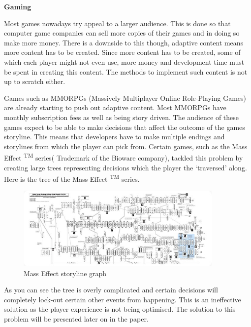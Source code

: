 \documentclass[11pt]{article}
\begin{document}
\vspace{4.0 mm}
\textbf{Gaming}
\vspace{4.0 mm}

Most games nowadays try appeal to a larger audience. This is done so that computer game companies can sell more copies of their games and in doing so make more money. There is a downside to this though, adaptive content means more content has to be created. Since more content has to be created, some of which each player might not even use, more money and development time must be spent in creating this content. The methods to implement such content is not up to scratch either.
\vspace{7.0 mm}

Games such as MMORPGs (Massively Multiplayer Online Role-Playing Games) are already starting to push out adaptive content. Most MMORPGs have monthly subscription fees as well as being story driven. The audience of these games expect to be able to make decisions that affect the outcome of the games storyline. This means that developers have to make multiple endings and storylines from which the player can pick from. Certain games, such as the Mass Effect \textsuperscript{TM} series( Trademark of the Bioware company), tackled this problem by creating large trees representing decisions which the player the `traversed' along. Here is the tree of the Mass Effect \textsuperscript{TM} series.
\vspace{4.0 mm}

\begin{figure}[h!]
    \centering
    \includegraphics[width=0.9\textwidth]{tree.jpg}
    \caption{Mass Effect storyline graph}
\end{figure}
\vspace{4.0 mm}

As you can see the tree is overly complicated and certain decisions will completely lock-out certain other events from happening. This is an ineffective solution as the player experience is not being optimised. The solution to this problem will be presented later on in the paper.
\end{document}
